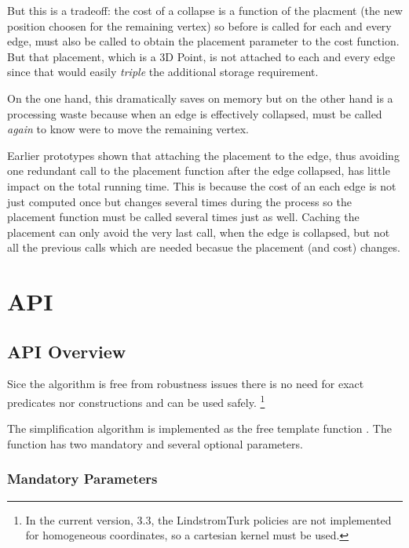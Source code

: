 But this is a tradeoff: the cost of a collapse is a function of the placment
(the new position choosen for the remaining vertex) so before 
is called for each and every edge,  must also be called to obtain
the placement parameter to the cost function.
But that placement, which is a 3D Point, is not attached to each and every edge since
that would easily {\em triple} the additional storage requirement.

On the one hand, this dramatically saves on memory but on the other hand is
a processing waste because when an edge is effectively collapsed,  
must be called {\em again} to know were to move the remaining vertex.

Earlier prototypes shown that attaching the placement to the edge, thus avoiding one
redundant call to the placement function after the edge collapsed, has little 
impact on the total running time. This is because the cost of an each edge is not just
computed once but changes several times during the process so the placement function
must be called several times just as well. Caching the placement can only avoid the 
very last call, when the edge is collapsed, but not all the previous calls which
are needed becasue the placement (and cost) changes.

\section{API}

\subsection{API Overview}

Sice the algorithm is free from robustness issues there is no need for exact predicates nor constructions and  can be used safely.
\footnote{In the current version, 3.3, the LindstromTurk policies are not implemented for homogeneous coordinates, so a cartesian kernel must be used.}

The simplification algorithm is implemented as the free template function 
. The function has two mandatory and several optional parameters.

\subsubsection{Mandatory Parameters}

